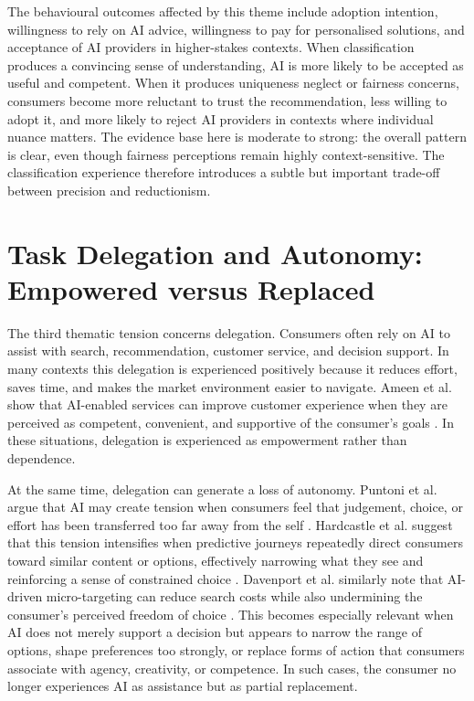 The behavioural outcomes affected by this theme include adoption intention, willingness to rely on AI advice, willingness to pay for personalised solutions, and acceptance of AI providers in higher-stakes contexts. When classification produces a convincing sense of understanding, AI is more likely to be accepted as useful and competent. When it produces uniqueness neglect or fairness concerns, consumers become more reluctant to trust the recommendation, less willing to adopt it, and more likely to reject AI providers in contexts where individual nuance matters. The evidence base here is moderate to strong: the overall pattern is clear, even though fairness perceptions remain highly context-sensitive. The classification experience therefore introduces a subtle but important trade-off between precision and reductionism.

\section{Task Delegation and Autonomy: Empowered versus Replaced}
The third thematic tension concerns delegation. Consumers often rely on AI to assist with search, recommendation, customer service, and decision support. In many contexts this delegation is experienced positively because it reduces effort, saves time, and makes the market environment easier to navigate. Ameen et al. show that AI-enabled services can improve customer experience when they are perceived as competent, convenient, and supportive of the consumer's goals \cite{ameen2021customer}. In these situations, delegation is experienced as empowerment rather than dependence.

At the same time, delegation can generate a loss of autonomy. Puntoni et al. argue that AI may create tension when consumers feel that judgement, choice, or effort has been transferred too far away from the self \cite{puntoni2021experiential}. Hardcastle et al. suggest that this tension intensifies when predictive journeys repeatedly direct consumers toward similar content or options, effectively narrowing what they see and reinforcing a sense of constrained choice \cite{hardcastle2025journeys}. Davenport et al. similarly note that AI-driven micro-targeting can reduce search costs while also undermining the consumer's perceived freedom of choice \cite{davenport2020future}. This becomes especially relevant when AI does not merely support a decision but appears to narrow the range of options, shape preferences too strongly, or replace forms of action that consumers associate with agency, creativity, or competence. In such cases, the consumer no longer experiences AI as assistance but as partial replacement.


